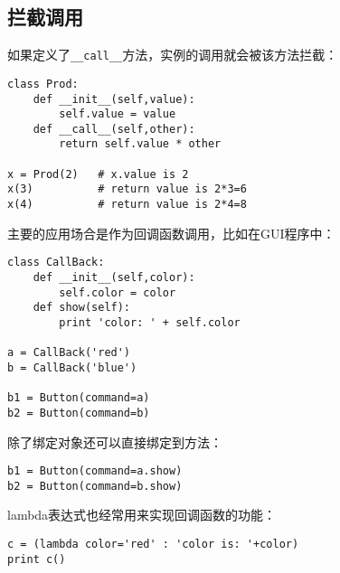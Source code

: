 \subsection{拦截调用}

如果定义了\verb|__call__|方法，实例的调用就会被该方法拦截：

\begin{lstlisting}
class Prod:
	def __init__(self,value):
		self.value = value
	def __call__(self,other):
		return self.value * other

x = Prod(2)   # x.value is 2
x(3)          # return value is 2*3=6
x(4)          # return value is 2*4=8
\end{lstlisting}

主要的应用场合是作为回调函数调用，比如在GUI程序中：

\begin{lstlisting}
class CallBack:
	def __init__(self,color):
		self.color = color
	def show(self):
		print 'color: ' + self.color

a = CallBack('red')
b = CallBack('blue')

b1 = Button(command=a)
b2 = Button(command=b)
\end{lstlisting}

除了绑定对象还可以直接绑定到方法：

\begin{lstlisting}
b1 = Button(command=a.show)
b2 = Button(command=b.show)
\end{lstlisting}

lambda表达式也经常用来实现回调函数的功能：

\begin{lstlisting}
c = (lambda color='red' : 'color is: '+color)
print c()
\end{lstlisting}

\begin{lstlisting}
\end{lstlisting}

\begin{lstlisting}
\end{lstlisting}


